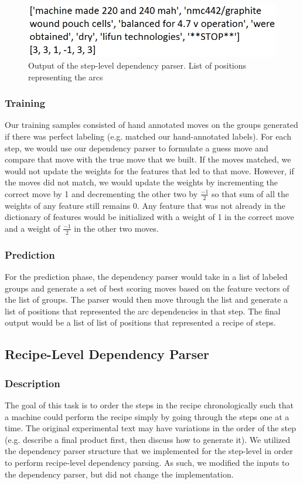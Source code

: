\begin{figure}
  \centering
    \includegraphics[width=.5\textwidth]{dep1out.png}
  \caption{Output of the step-level dependency parser. List of positions representing the arcs}
\end{figure}

\subsubsection{Training}
Our training samples consisted of hand annotated moves on the groups generated if there was perfect labeling (e.g. matched our hand-annotated labels). For each step, we would use our dependency parser to formulate a guess move and compare that move with the true move that we built. If the moves matched, we would not update the weights for the features that led to that move. However, if the moves did not match, we would update the weights by incrementing the correct move by 1 and decrementing the other two by $\frac{-1}{2}$ so that sum of all the weights of any feature still remains 0. Any feature that was not already in the dictionary of features would be initialized with a weight of 1 in the correct move and a weight of $\frac{-1}{2}$ in the other two moves. 

\subsubsection{Prediction}
For the prediction phase, the dependency parser would take in a list of labeled groups and generate a set of best scoring moves based on the feature vectors of the list of groups. The parser would then move through the list and generate a list of positions that represented the arc dependencies in that step. The final output would be a list of list of positions that represented a recipe of steps. 

\subsection{Recipe-Level Dependency Parser}

\subsubsection{Description}
The goal of this task is to order the steps in the recipe chronologically such that a machine could perform the recipe simply by going through the steps one at a time. The original experimental text may have variations in the order of the step (e.g. describe a final product first, then discuss how to generate it). We utilized the dependency parser structure that we implemented for the step-level in order to perform recipe-level dependency parsing. As such, we modified the inputs to the dependency parser, but did not change the implementation. 

